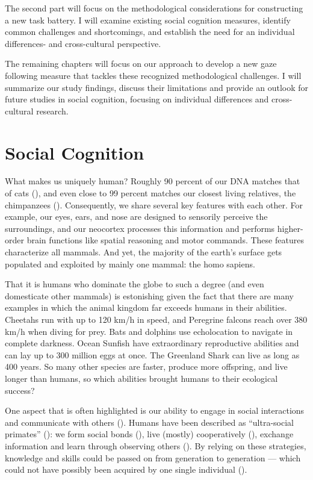 \documentclass[
]{scrbook}
\begin{document}
The second part will focus on the methodological considerations for constructing a new task battery. I will examine existing social cognition measures, identify common challenges and shortcomings, and establish the need for an individual differences- and cross-cultural perspective.

The remaining chapters will focus on our approach to develop a new gaze following measure that tackles these recognized methodological challenges. I will summarize our study findings, discuss their limitations and provide an outlook for future studies in social cognition, focusing on individual differences and cross-cultural research.

\section{Social Cognition}\label{social-cognition}

What makes us uniquely human? Roughly 90 percent of our DNA matches that of cats (), and even close to 99 percent matches our closest living relatives, the chimpanzees (). Consequently, we share several key features with each other. For example, our eyes, ears, and nose are designed to sensorily perceive the surroundings, and our neocortex processes this information and performs higher-order brain functions like spatial reasoning and motor commands. These features characterize all mammals. And yet, the majority of the earth's surface gets populated and exploited by mainly one mammal: the homo sapiens.

That it is humans who dominate the globe to such a degree (and even domesticate other mammals) is estonishing given the fact that there are many examples in which the animal kingdom far exceeds humans in their abilities. Cheetahs run with up to 120 km/h in speed, and Peregrine falcons reach over 380 km/h when diving for prey. Bats and dolphins use echolocation to navigate in complete darkness. Ocean Sunfish have extraordinary reproductive abilities and can lay up to 300 million eggs at once. The Greenland Shark can live as long as 400 years. So many other species are faster, produce more offspring, and live longer than humans, so which abilities brought humans to their ecological success?

One aspect that is often highlighted is our ability to engage in social interactions and communicate with others (). Humans have been described as ``ultra-social primates'' (): we form social bonds (), live (mostly) cooperatively (), exchange information and learn through observing others (). By relying on these strategies, knowledge and skills could be passed on from generation to generation --- which could not have possibly been acquired by one single individual ().
\end{document}
